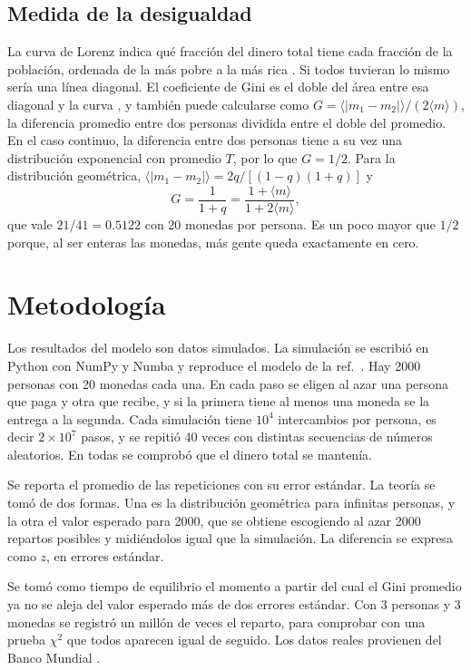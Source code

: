 \documentclass[letterpaper,12pt]{article}
\begin{document}
\subsection*{Medida de la desigualdad}
La curva de Lorenz indica qué fracción del dinero total tiene cada fracción de la población, ordenada de la más pobre a la más rica \cite{lorenz}. Si todos tuvieran lo mismo sería una línea diagonal. El coeficiente de Gini es el doble del área entre esa diagonal y la curva \cite{gini}, y también puede calcularse como $G=\langle|m_1-m_2|\rangle/(2\langle m\rangle)$, la diferencia promedio entre dos personas dividida entre el doble del promedio. En el caso continuo, la diferencia entre dos personas tiene a su vez una distribución exponencial con promedio $T$, por lo que $G=1/2$. Para la distribución geométrica, $\langle|m_1-m_2|\rangle=2q/[(1-q)(1+q)]$ y
\begin{equation}
  G=\frac{1}{1+q}=\frac{1+\langle m\rangle}{1+2\langle m\rangle},
  \label{eq:ginidiscreto}
\end{equation}
que vale $21/41=0.5122$ con 20 monedas por persona. Es un poco mayor que $1/2$ porque, al ser enteras las monedas, más gente queda exactamente en cero.

\section*{Metodología}
Los resultados del modelo son datos simulados. La simulación se escribió en Python con NumPy y Numba \cite{numpy} y reproduce el modelo de la ref.~\cite{dy2000}. Hay 2000 personas con 20 monedas cada una. En cada paso se eligen al azar una persona que paga y otra que recibe, y si la primera tiene al menos una moneda se la entrega a la segunda. Cada simulación tiene $10^{4}$ intercambios por persona, es decir $2\times10^{7}$ pasos, y se repitió 40 veces con distintas secuencias de números aleatorios. En todas se comprobó que el dinero total se mantenía.

Se reporta el promedio de las repeticiones con su error estándar. La teoría se tomó de dos formas. Una es la distribución geométrica para infinitas personas, y la otra el valor esperado para 2000, que se obtiene escogiendo al azar 2000 repartos posibles y midiéndolos igual que la simulación. La diferencia se expresa como $z$, en errores estándar.

Se tomó como tiempo de equilibrio el momento a partir del cual el Gini promedio ya no se aleja del valor esperado más de dos errores estándar. Con 3 personas y 3 monedas se registró un millón de veces el reparto, para comprobar con una prueba $\chi^2$ que todos aparecen igual de seguido. Los datos reales provienen del Banco Mundial \cite{pip}.
\end{document}
